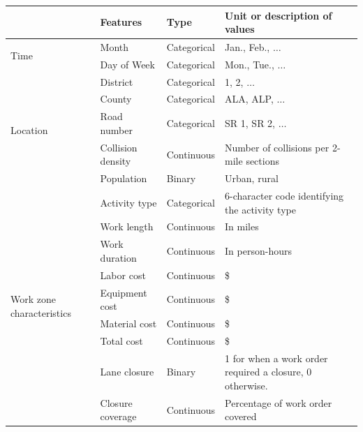 \documentclass[10pt,a4paper]{article}
\begin{document}
\begin{table}[ht!]
\centering
\begin{tabular}{lllp{5cm}}
\hline
                          & Features           & Type        & Unit or description of values\\
\hline
\multicolumn{1}{l|}{\multirow{2}{*}{Time}}     & Month                  & Categorical & Jan., Feb., $\ldots$\\
\multicolumn{1}{l|}{}                          & Day of Week            & Categorical & Mon., Tue., $\ldots$\\
\hline
\multicolumn{1}{l|}{\multirow{5}{*}{Location}} & District               & Categorical & 1, 2, $\ldots$\\
\multicolumn{1}{l|}{}                          & County                 & Categorical & ALA, ALP, $\ldots$\\
\multicolumn{1}{l|}{}                          & Road number            & Categorical & SR 1, SR 2, $\ldots$\\
\multicolumn{1}{l|}{}                          & Collision density      & Continuous  & Number of collisions per 2-mile sections\\
\multicolumn{1}{l|}{}                          & Population             & Binary      & Urban, rural\\
\hline
\multicolumn{1}{l|}{\multirow{17}{*}{Work zone characteristics}}    & Activity type          & Categorical & 6-character code identifying the activity type\\
\multicolumn{1}{l|}{}                          & Work length            & Continuous  & In miles\\
\multicolumn{1}{l|}{}                          & Work duration          & Continuous  & In person-hours\\
\multicolumn{1}{l|}{}                          & Labor cost             & Continuous  & \$\\
\multicolumn{1}{l|}{}                          & Equipment cost         & Continuous  & \$\\
\multicolumn{1}{l|}{}                          & Material cost          & Continuous  & \$\\
\multicolumn{1}{l|}{}                          & Total cost             & Continuous  & \$\\
\multicolumn{1}{l|}{}                          & Lane closure           & Binary      & 1 for when a work order required a closure, 0 otherwise.\\
\multicolumn{1}{l|}{}                          & Closure coverage       & Continuous  & Percentage of work order covered\\

\end{tabular}
\end{table}
\end{document}
